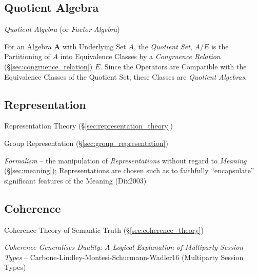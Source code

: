 \subsection{Quotient Algebra}\label{sec:quotient_algebra}

\emph{Quotient Algebra} (or \emph{Factor Algebra})

For an Algebra $\mathbf{A}$ with Underlying Set $A$, the
\emph{Quotient Set}, $A / E$ is the Partitioning of $A$ into
Equivalence Classes by a \emph{Congruence Relation}
(\S\ref{sec:congruence_relation}) $E$. Since the Operators are
Compatible with the Equivalence Classes of the Quotient Set, these
Classes are \emph{Quotient Algebras}.



\subsection{Representation}\label{sec:model_representation}

Representation Theory (\S\ref{sec:representation_theory})

Group Representation (\S\ref{sec:group_representation})


\emph{Formalism} -- the manipulation of \emph{Representations} without regard to
\emph{Meaning} (\S\ref{sec:meaning});
Representations are chosen such as to faithfully ``encapsulate'' significant
features of the Meaning (Dix2003)



\subsection{Coherence}\label{sec:coherence}

\fist Coherence Theory of Semantic Truth (\S\ref{sec:coherence_theory})

\emph{Coherence Generalises Duality: A Logical Explanation of
  Multiparty Session Types} --
Carbone-Lindley-Montesi-Schurmann-Wadler16 (Multiparty Session Types)



